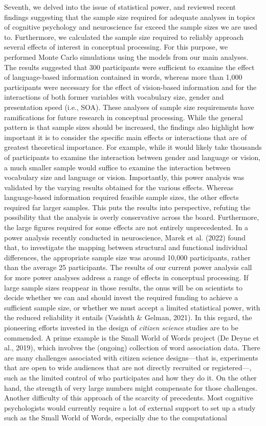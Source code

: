 \documentclass[
  12pt,
  man,floatsintext]{apa7}
\begin{document}
Seventh, we delved into the issue of statistical power, and reviewed recent findings suggesting that the sample size required for adequate analyses in topics of cognitive psychology and neuroscience far exceed the sample sizes we are used to. Furthermore, we calculated the sample size required to reliably approach several effects of interest in conceptual processing. For this purpose, we performed Monte Carlo simulations using the models from our main analyses. The results suggested that 300 participants were sufficient to examine the effect of language-based information contained in words, whereas more than 1,000 participants were necessary for the effect of vision-based information and for the interactions of both former variables with vocabulary size, gender and presentation speed (i.e., SOA). These analyses of sample size requirements have ramifications for future research in conceptual processing. While the general pattern is that sample sizes should be increased, the findings also highlight how important it is to consider the specific main effects or interactions that are of greatest theoretical importance. For example, while it would likely take thousands of participants to examine the interaction between gender and language or vision, a much smaller sample would suffice to examine the interaction between vocabulary size and language or vision. Importantly, this power analysis was validated by the varying results obtained for the various effects. Whereas language-based information required feasible sample sizes, the other effects required far larger samples. This puts the results into perspective, refuting the possibility that the analysis is overly conservative across the board. Furthermore, the large figures required for some effects are not entirely unprecedented. In a power analysis recently conducted in neuroscience, Marek et al. (2022) found that, to investigate the mapping between structural and functional individual differences, the appropriate sample size was around 10,000 participants, rather than the average 25 participants. The results of our current power analysis call for more power analyses address a range of effects in conceptual processing. If large sample sizes reappear in those results, the onus will be on scientists to decide whether we can and should invest the required funding to achieve a sufficient sample size, or whether we must accept a limited statistical power, with the reduced reliability it entails (Vasishth \& Gelman, 2021). In this regard, the pioneering efforts invested in the design of \emph{citizen science} studies are to be commended. A prime example is the Small World of Words project (De Deyne et al., 2019), which involves the (ongoing) collection of word association data. There are many challenges associated with citizen science designs---that is, experiments that are open to wide audiences that are not directly recruited or registered---, such as the limited control of who participates and how they do it. On the other hand, the strength of very large numbers might compensate for those challenges. Another difficulty of this approach of the scarcity of precedents. Most cognitive psychologists would currently require a lot of external support to set up a study such as the Small World of Words, especially due to the computational 
\end{document}

